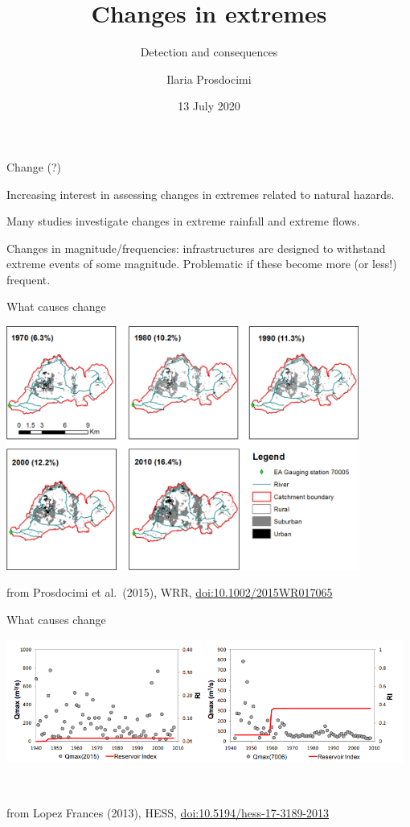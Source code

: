 \documentclass[
  10pt,
  ignorenonframetext,
  compress]{beamer}
\title{Changes in extremes}
\subtitle{Detection and consequences}
\author{Ilaria Prosdocimi}
\date{13 July 2020}
\begin{document}
\frame{\titlepage}

\begin{frame}{Change (?)}
\protect\hypertarget{change}{}

Increasing interest in assessing changes in extremes related to natural
hazards.

Many studies investigate changes in extreme rainfall and extreme flows.

Changes in magnitude/frequencies: infrastructures are designed to
withstand extreme events of some magnitude. Problematic if these become
more (or less!) frequent.

\end{frame}

\begin{frame}{What causes change}
\protect\hypertarget{what-causes-change}{}

\begin{center}\includegraphics[width=0.87\textwidth]{wrcr21514-fig-0002-m} \end{center}

\footnotesize   from Prosdocimi et al.~(2015), WRR,
\url{doi:10.1002/2015WR017065}

\end{frame}

\begin{frame}{What causes change}
\protect\hypertarget{what-causes-change-1}{}

\begin{center}\includegraphics[width=0.98\textwidth]{ResIndex} \end{center}

~

\footnotesize   from Lopez Frances (2013), HESS,
\url{doi:10.5194/hess-17-3189-2013}

\end{frame}
\end{document}
